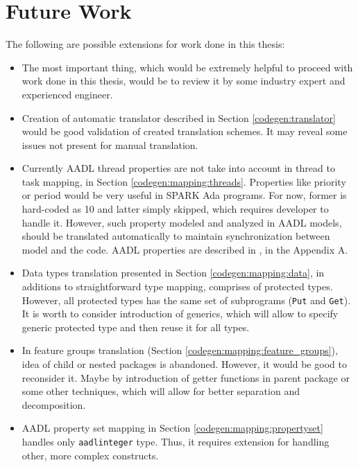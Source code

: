 
\cleardoublepage

\chapter{Future Work}
\label{future_work}

The following are possible extensions for work done in this thesis:

\begin{itemize}
	\item The most important thing, which would be extremely helpful to proceed with work done in this thesis, would be to review it by some industry expert and experienced engineer.
	\item Creation of automatic translator described in Section \ref{codegen:translator} would be good validation of created translation schemes. It may reveal some issues not present for manual translation.
	\item Currently AADL thread properties are not take into account in thread to task mapping, in Section \ref{codegen:mapping:threads}. Properties like priority or period would be very useful in SPARK Ada programs. For now, former is hard-coded as 10 and latter simply skipped, which requires developer to handle it. However, such property modeled and analyzed in AADL models, should be translated automatically to maintain synchronization between model and the code. AADL properties are described in \cite{AadlBook}, in the Appendix A.
	\item Data types translation presented in Section \ref{codegen:mapping:data}, in additions to straightforward type mapping, comprises of protected types. However, all protected types has the same set of subprograms (\lstinline{Put} and \lstinline{Get}). It is worth to consider introduction of generics, which will allow to specify generic protected type and then reuse it for all types.
	\item In feature groups translation (Section \ref{codegen:mapping:feature_groups}), idea of child or nested packages is abandoned. However, it would be good to reconsider it. Maybe by introduction of getter functions in parent package or some other techniques, which will allow for better separation and decomposition.
	\item AADL property set mapping in Section \ref{codegen:mapping:propertyset} handles only \lstinline{aadlinteger} type. Thus, it requires extension for handling other, more complex constructs.

\end{itemize}
